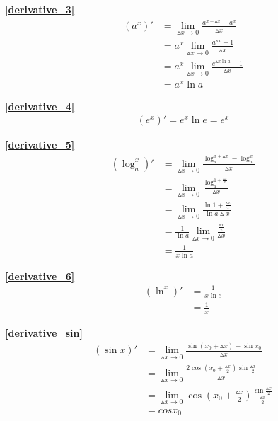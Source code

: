 \textbf{\large \ref{derivative_3}}
\begin{displaymath}
    \begin{split}
        \left(a^x\right)'&=\lim\limits_{\vartriangle x\to 0}\frac{a^{x+\vartriangle x}-a^x}{\vartriangle x}\\
        &=a^x\lim\limits_{\vartriangle x\to 0}\frac{a^{\vartriangle x}-1}{\vartriangle x}\\
        &=a^x\lim\limits_{\vartriangle x\to 0}\frac{e^{\vartriangle x \ln a}-1}{\vartriangle x}\\
        &=a^x\ln a
    \end{split}
\end{displaymath}

\textbf{\large \ref{derivative_4}}
\begin{displaymath}
    \begin{split}
        \left(e^x\right)'=e^x\ln e=e^x
    \end{split}
\end{displaymath}

\textbf{\large \ref{derivative_5}}
\begin{displaymath}
    \begin{split}
        \left(\log_a^x\right)'&=\lim\limits_{\vartriangle x\to 0}\frac{\log_a^{x+\vartriangle x}-\log_a^x}{\vartriangle x}\\
        &=\lim\limits_{\vartriangle x\to 0}\frac{\log_a^{1+\frac{\vartriangle x}{x}}}{\vartriangle x}\\
        &=\lim\limits_{\vartriangle x\to 0}\frac{\ln{1+\frac{\vartriangle x}{x}}}{\ln a\vartriangle x}\\
        &=\frac{1}{\ln a}\lim\limits_{\vartriangle x\to 0}\frac{\frac{\vartriangle x}{x}}{\vartriangle x}\\
        &=\frac{1}{x\ln a}
    \end{split}
\end{displaymath}

\textbf{\large \ref{derivative_6}}
\begin{displaymath}
    \begin{split}
        \left(\ln^x\right)'&=\frac{1}{x\ln e}\\
        &=\frac{1}{x}
    \end{split}
\end{displaymath}

\textbf{\large \ref{derivative_sin}}
\begin{displaymath}
    \begin{split}
        (\sin x)'&=\lim\limits_{\vartriangle x\to 0}\frac{\sin (x_0 +\vartriangle x)-\sin x_0}{\vartriangle x}\\
        &=\lim\limits_{\vartriangle x\to 0}\frac{2\cos(x_0+\frac{\vartriangle x}{2})\sin \frac{\vartriangle x}{2}}{\vartriangle x}\\
        &=\lim\limits_{\vartriangle x\to 0}\cos(x_0+\frac{\vartriangle x}{2})\frac{\sin\frac{\vartriangle x}{2}}{\frac{\vartriangle x}{2}}\\
        &=cos x_0
    \end{split}
\end{displaymath}

